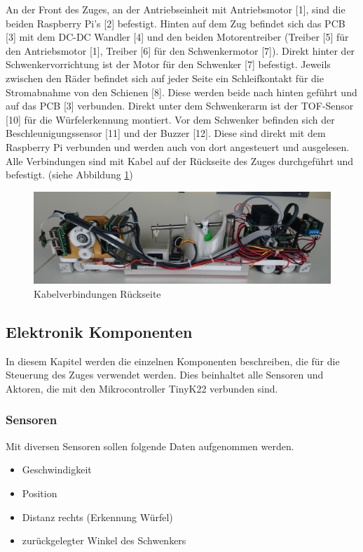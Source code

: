 \documentclass[../../main.tex]{subfiles}
\begin{document}
    An der Front des Zuges, an der Antriebseinheit mit Antriebsmotor [1], sind die beiden Raspberry Pi's [2] befestigt. Hinten auf dem Zug befindet sich das PCB [3] mit dem DC-DC Wandler [4] und den beiden Motorentreiber (Treiber [5] für den Antriebsmotor [1], Treiber [6] für den Schwenkermotor [7]). Direkt hinter der Schwenkervorrichtung ist der Motor für den Schwenker [7] befestigt. Jeweils zwischen den Räder befindet sich auf jeder Seite ein Schleifkontakt für die Stromabnahme von den Schienen [8]. Diese werden beide nach hinten geführt und auf das PCB [3] verbunden. Direkt unter dem Schwenkerarm ist der TOF-Sensor [10] für die Würfelerkennung montiert. Vor dem Schwenker befinden sich der Beschleunigungssensor [11] und der Buzzer [12]. Diese sind direkt mit dem Raspberry Pi verbunden und werden auch von dort angesteuert und ausgelesen.\\
     Alle Verbindungen sind mit Kabel auf der Rückseite des Zuges durchgeführt und befestigt. (siehe Abbildung \ref{fig:et_kabel})\\

    \begin{figure}[H]
        \centering
        \includegraphics[width=1.0\textwidth]{../../images/et/et_kabel.jpg}
        \caption {Kabelverbindungen Rückseite}
        \label{fig:et_kabel}
    \end{figure}

    \subsection{Elektronik Komponenten} \label{et_Komponenten}
    In diesem Kapitel werden die einzelnen Komponenten beschreiben, die für die Steuerung des Zuges verwendet werden. Dies beinhaltet alle Sensoren und Aktoren, die mit den Mikrocontroller TinyK22 verbunden sind.

    \subsubsection{Sensoren} \label{et_sensoren}
    Mit diversen Sensoren sollen folgende Daten aufgenommen werden.
    \begin{itemize}
        \item Geschwindigkeit
        \item Position
        \item Distanz rechts (Erkennung Würfel)
        \item zurückgelegter Winkel des Schwenkers
    \end{itemize}
\end{document}
